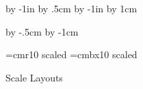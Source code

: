 
















\vsize=297mm
\hsize=210mm

\advance\voffset by -1in
\advance\voffset by .5cm
\advance\hoffset by -1in
\advance\hoffset by 1cm

\advance\vsize by -.5cm
\advance\hsize by -1cm

\parindent=0pt

\enablehyperlinks[dvipdfm]

\font\largerm=cmr10  scaled \magstephalf
\font\largebf=cmbx10 scaled \magstephalf

\def\epsfsize#1#2{#1}


\centerline{{\largebf Scale Layouts}}


